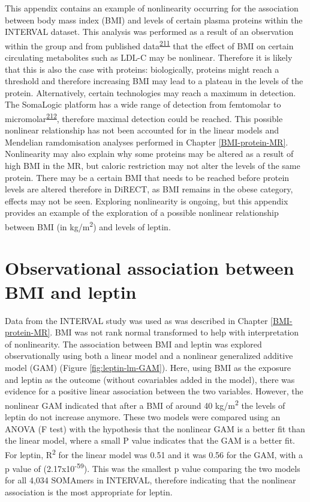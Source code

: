 \documentclass[11pt,twoside]{bristolthesis}
\begin{document}
This appendix contains an example of nonlinearity occurring for the association between body mass index (BMI) and levels of certain plasma proteins within the INTERVAL dataset. This analysis was performed as a result of an observation within the group and from published data\textsuperscript{\protect\hyperlink{ref-Li2021}{211}} that the effect of BMI on certain circulating metabolites such as LDL-C may be nonlinear. Therefore it is likely that this is also the case with proteins: biologically, proteins might reach a threshold and therefore increasing BMI may lead to a plateau in the levels of the protein. Alternatively, certain technologies may reach a maximum in detection. The SomaLogic platform has a wide range of detection from femtomolar to micromolar\textsuperscript{\protect\hyperlink{ref-Lim2017}{212}}, therefore maximal detection could be reached. This possible nonlinear relationship has not been accounted for in the linear models and Mendelian ramdomisation analyses performed in Chapter \ref{BMI-protein-MR}. Nonlinearity may also explain why some proteins may be altered as a result of high BMI in the MR, but caloric restriction may not alter the levels of the same protein. There may be a certain BMI that needs to be reached before protein levels are altered therefore in DiRECT, as BMI remains in the obese category, effects may not be seen. Exploring nonlinearity is ongoing, but this appendix provides an example of the exploration of a possible nonlinear relationship between BMI (in kg/m\textsuperscript{2}) and levels of leptin.

\hypertarget{observational-association-between-bmi-and-leptin}{%
\section{Observational association between BMI and leptin}\label{observational-association-between-bmi-and-leptin}}

Data from the INTERVAL study was used as was described in Chapter \ref{BMI-protein-MR}. BMI was not rank normal transformed to help with interpretation of nonlinearity. The association between BMI and leptin was explored observationally using both a linear model and a nonlinear generalized additive model (GAM) (Figure \ref{fig:leptin-lm-GAM}). Here, using BMI as the exposure and leptin as the outcome (without covariables added in the model), there was evidence for a positive linear association between the two variables. However, the nonlinear GAM indicated that after a BMI of around 40 kg/m\textsuperscript{2} the levels of leptin do not increase anymore. These two models were compared using an ANOVA (F test) with the hypothesis that the nonlinear GAM is a better fit than the linear model, where a small P value indicates that the GAM is a better fit. For leptin, R\textsuperscript{2} for the linear model was 0.51 and it was 0.56 for the GAM, with a p value of (2.17x10\textsuperscript{-59}). This was the smallest p value comparing the two models for all 4,034 SOMAmers in INTERVAL, therefore indicating that the nonlinear association is the most appropriate for leptin.
\end{document}
